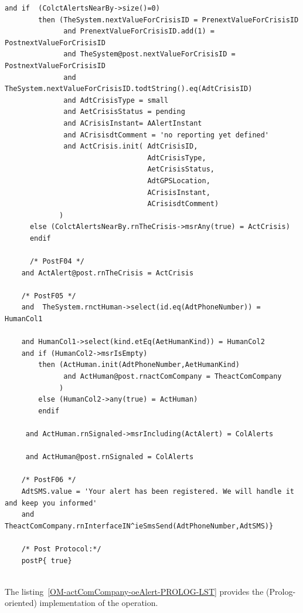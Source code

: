 \begin{lstlisting}[style=MessirStyle,firstnumber=auto,captionpos=b,caption={\msrmessir (MCL-oriented) specification of the operation \emph{oeAlert}.},label=OM-actComCompany-oeAlert-MCL-LST]
	and if  (ColctAlertsNearBy->size()=0)
	    then (TheSystem.nextValueForCrisisID = PrenextValueForCrisisID
	          and PrenextValueForCrisisID.add(1) = PostnextValueForCrisisID
	          and TheSystem@post.nextValueForCrisisID = PostnextValueForCrisisID
	          and TheSystem.nextValueForCrisisID.todtString().eq(AdtCrisisID)
	          and AdtCrisisType = small
	          and AetCrisisStatus = pending
	          and ACrisisInstant= AAlertInstant
	          and ACrisisdtComment = 'no reporting yet defined'
	          and ActCrisis.init( AdtCrisisID,
	                              AdtCrisisType,
	                              AetCrisisStatus,
	                              AdtGPSLocation,
	                              ACrisisInstant,
	                              ACrisisdtComment)
	         )
	  else (ColctAlertsNearBy.rnTheCrisis->msrAny(true) = ActCrisis)
	  endif
	
	  /* PostF04 */
	and ActAlert@post.rnTheCrisis = ActCrisis
	      
	/* PostF05 */
	and  TheSystem.rnctHuman->select(id.eq(AdtPhoneNumber)) = HumanCol1
	
	and HumanCol1->select(kind.etEq(AetHumanKind)) = HumanCol2
	and if (HumanCol2->msrIsEmpty)
	    then (ActHuman.init(AdtPhoneNumber,AetHumanKind)
	          and ActHuman@post.rnactComCompany = TheactComCompany
	         )
	    else (HumanCol2->any(true) = ActHuman)
	    endif
	    
	 and ActHuman.rnSignaled->msrIncluding(ActAlert) = ColAlerts
	 
	 and ActHuman@post.rnSignaled = ColAlerts
	
	/* PostF06 */
	AdtSMS.value = 'Your alert has been registered. We will handle it and keep you informed'
	and TheactComCompany.rnInterfaceIN^ieSmsSend(AdtPhoneNumber,AdtSMS)}
	
	/* Post Protocol:*/ 
	postP{ true}
	
	\end{lstlisting}
	\normalsize 
	
	
	
	
	
	\vspace{1cm}
	The listing~\ref{OM-actComCompany-oeAlert-PROLOG-LST} provides the \msrmessir (Prolog-oriented) implementation of the operation.
	
	\scriptsize
	\vspace{0.5cm}
	
